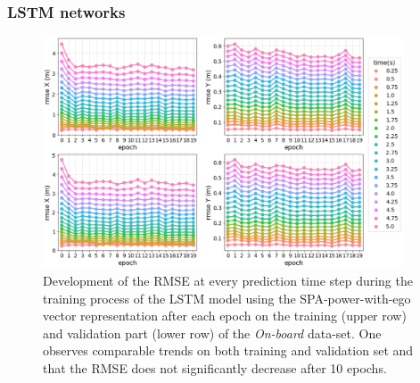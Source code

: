 \subsubsection{\ac{LSTM} networks}
\label{subsubsec:train_lstm}
\begin{figure}[t!]
  \centering
  \includegraphics[width=0.95\textwidth]{imgs/rmse_dev_over_epochs.eps}
  \caption{Development of the \ac{RMSE} at every prediction time step during the training process of the \ac{LSTM} model using the \ac{SPA}-power-with-ego vector representation after each epoch on the training (upper row) and validation part (lower row) of the \emph{On-board} data-set. One observes comparable trends on both training and validation set and that the \ac{RMSE} does not significantly decrease after \num{10} epochs.}\label{fig:rmse_dev_over_epochs}
\end{figure}


